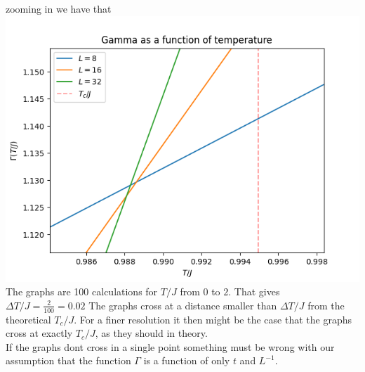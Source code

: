 \documentclass[12pt]{article}
\begin{document}
zooming in we have that \\
\includegraphics[width = \textwidth]{gamma_zoom.png}\\
The graphs are 100 calculations for $T/J$ from $0$ to $2$. That gives $\Delta
T/J = \frac{2}{100} = 0.02$ The graphs cross at a distance smaller than $\Delta
T/J$ from the theoretical $T_c/J$. For a finer resolution it then might be the
case that the graphs cross at exactly $T_c/J$, as they should in theory. \\
If the graphs dont cross in a single point something must be wrong with our
assumption that the function $\Gamma$ is a function of only $t$ and $L^{-1}$.
\end{document}
